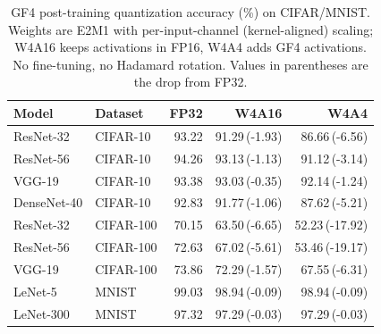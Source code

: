 
\begin{table}[t]
  \centering
  \caption{GF4 post-training quantization accuracy (\%) on CIFAR/MNIST. Weights are
    E2M1 with per-input-channel (kernel-aligned) scaling; W4A16 keeps activations in
    FP16, W4A4 adds GF4 activations. No fine-tuning, no Hadamard rotation.
    Values in parentheses are the drop from FP32.}
  \label{tab:gf4-accuracy}
  \begin{tabular}{llrrr}
    \toprule
    Model & Dataset & FP32 & W4A16 & W4A4 \\
    \midrule
    ResNet-32   & CIFAR-10  & 93.22 & 91.29\,(-1.93) & 86.66\,(-6.56) \\
    ResNet-56   & CIFAR-10  & 94.26 & 93.13\,(-1.13) & 91.12\,(-3.14) \\
    VGG-19      & CIFAR-10  & 93.38 & 93.03\,(-0.35) & 92.14\,(-1.24) \\
    DenseNet-40 & CIFAR-10  & 92.83 & 91.77\,(-1.06) & 87.62\,(-5.21) \\
    \midrule
    ResNet-32   & CIFAR-100 & 70.15 & 63.50\,(-6.65) & 52.23\,(-17.92) \\
    ResNet-56   & CIFAR-100 & 72.63 & 67.02\,(-5.61) & 53.46\,(-19.17) \\
    VGG-19      & CIFAR-100 & 73.86 & 72.29\,(-1.57) & 67.55\,(-6.31) \\
    \midrule
    LeNet-5     & MNIST     & 99.03 & 98.94\,(-0.09) & 98.94\,(-0.09) \\
    LeNet-300   & MNIST     & 97.32 & 97.29\,(-0.03) & 97.29\,(-0.03) \\
    \bottomrule
  \end{tabular}
\end{table}

